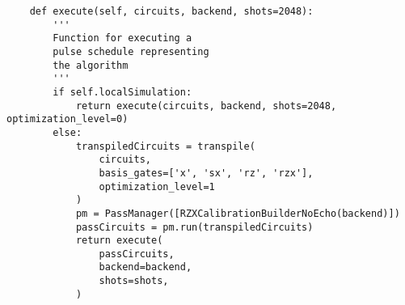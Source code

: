     \begin{verbatim}
    def execute(self, circuits, backend, shots=2048):
        '''
        Function for executing a
        pulse schedule representing
        the algorithm
        '''
        if self.localSimulation:
            return execute(circuits, backend, shots=2048, optimization_level=0)
        else:
            transpiledCircuits = transpile(
                circuits,
                basis_gates=['x', 'sx', 'rz', 'rzx'],
                optimization_level=1
            )
            pm = PassManager([RZXCalibrationBuilderNoEcho(backend)])
            passCircuits = pm.run(transpiledCircuits)
            return execute(
                passCircuits,
                backend=backend,
                shots=shots,
            )
    \end{verbatim}